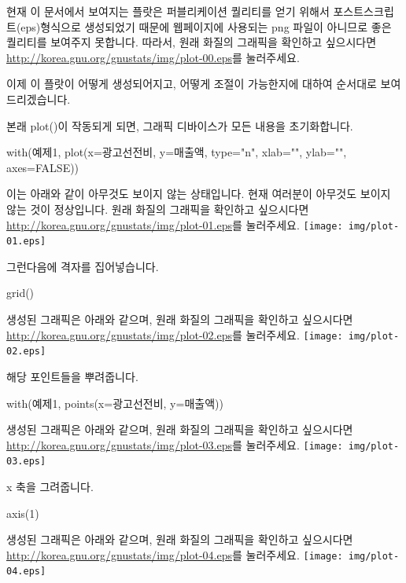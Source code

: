현재 이 문서에서 보여지는 플랏은 퍼블리케이션 퀄리티를 얻기 위해서 포스트스크립트(eps)형식으로 생성되었기 때문에 웹페이지에 사용되는 png 파일이 아니므로 좋은 퀄리티를 보여주지 못합니다. 
따라서, 원래 화질의 그래픽을 확인하고 싶으시다면 \href{http://korea.gnu.org/gnustats/img/plot-00.eps}{http://korea.gnu.org/gnustats/img/plot-00.eps}를 눌러주세요. 

이제 이 플랏이 어떻게 생성되어지고, 어떻게 조절이 가능한지에 대하여 순서대로 보여드리겠습니다.

본래 plot()이 작동되게 되면, 그래픽 디바이스가 모든 내용을 초기화합니다. 
\begin{Schunk}
\begin{Soutput}	
with(예제1, plot(x=광고선전비, y=매출액, type="n", xlab="", ylab="", axes=FALSE))
\end{Soutput}
\end{Schunk}

이는 아래와 같이 아무것도 보이지 않는 상태입니다. 
현재 여러분이 아무것도 보이지 않는 것이 정상입니다. 
원래 화질의 그래픽을 확인하고 싶으시다면 \href{http://korea.gnu.org/gnustats/img/plot-01.eps}{http://korea.gnu.org/gnustats/img/plot-01.eps}를 눌러주세요. 
\texttt{[image: img/plot-01.eps]}
 
 
그런다음에 격자를 집어넣습니다. 
\begin{Schunk}
\begin{Soutput}	
grid()
\end{Soutput}
\end{Schunk}
생성된 그래픽은 아래와 같으며, 원래 화질의 그래픽을 확인하고 싶으시다면 \href{http://korea.gnu.org/gnustats/img/plot-02.eps}{http://korea.gnu.org/gnustats/img/plot-02.eps}를 눌러주세요. 
\texttt{[image: img/plot-02.eps]}


해당 포인트들을 뿌려줍니다.
\begin{Schunk}
\begin{Soutput}	
with(예제1, points(x=광고선전비, y=매출액))
\end{Soutput}
\end{Schunk}
생성된 그래픽은 아래와 같으며, 원래 화질의 그래픽을 확인하고 싶으시다면 \href{http://korea.gnu.org/gnustats/img/plot-03.eps}{http://korea.gnu.org/gnustats/img/plot-03.eps}를 눌러주세요. 
\texttt{[image: img/plot-03.eps]}

x 축을 그려줍니다. 
\begin{Schunk}
\begin{Soutput}	
axis(1)
\end{Soutput}
\end{Schunk}
생성된 그래픽은 아래와 같으며, 원래 화질의 그래픽을 확인하고 싶으시다면 \href{http://korea.gnu.org/gnustats/img/plot-04.eps}{http://korea.gnu.org/gnustats/img/plot-04.eps}를 눌러주세요. 
\texttt{[image: img/plot-04.eps]}

